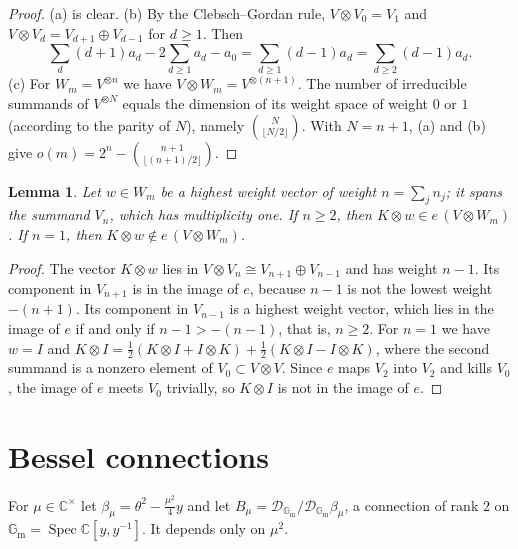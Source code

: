 \documentclass[11pt,a4paper]{article}
\newtheorem{lemma}[theorem]{Lemma}
\theoremstyle{definition}
\theoremstyle{remark}
\numberwithin{equation}{section}
\newcommand{\C}{\mathbb{C}}
\newcommand{\Gm}{\mathbb{G}_{\mathrm{m}}}
\newcommand{\cD}{\mathcal{D}}
\begin{document}
\begin{proof}
(a) is clear. (b) By the Clebsch--Gordan rule, $V\otimes V_0=V_1$ and $V\otimes V_d=V_{d+1}\oplus V_{d-1}$ for $d\ge1$. Then
\[
\sum_d(d+1)a_d-2\sum_{d\ge1}a_d-a_0=\sum_{d\ge1}(d-1)a_d=\sum_{d\ge2}(d-1)a_d .
\]
(c) For $W_m=V^{\otimes n}$ we have $V\otimes W_m=V^{\otimes(n+1)}$. The number of irreducible summands of $V^{\otimes N}$ equals the dimension of its weight space of weight $0$ or $1$ (according to the parity of $N$), namely $\binom{N}{\lfloor N/2\rfloor}$. With $N=n+1$, (a) and (b) give $o(m)=2^n-\binom{n+1}{\lfloor(n+1)/2\rfloor}$.
\end{proof}

\begin{lemma}\label{bo:lem:weight}
Let $w\in W_m$ be a highest weight vector of weight $n=\sum_jn_j$; it spans the summand $V_n$, which has multiplicity one. If $n\ge2$, then $K\otimes w\in e\,(V\otimes W_m)$. If $n=1$, then $K\otimes w\notin e\,(V\otimes W_m)$.
\end{lemma}

\begin{proof}
The vector $K\otimes w$ lies in $V\otimes V_n\cong V_{n+1}\oplus V_{n-1}$ and has weight $n-1$. Its component in $V_{n+1}$ is in the image of $e$, because $n-1$ is not the lowest weight $-(n+1)$. Its component in $V_{n-1}$ is a highest weight vector, which lies in the image of $e$ if and only if $n-1>-(n-1)$, that is, $n\ge2$. For $n=1$ we have $w=I$ and $K\otimes I=\tfrac12(K\otimes I+I\otimes K)+\tfrac12(K\otimes I-I\otimes K)$, where the second summand is a nonzero element of $V_0\subset V\otimes V$. Since $e$ maps $V_2$ into $V_2$ and kills $V_0$, the image of $e$ meets $V_0$ trivially, so $K\otimes I$ is not in the image of $e$.
\end{proof}

\section{Bessel connections}\label{bo:sec:bessel}

For $\mu\in\C^\times$ let $\beta_\mu=\theta^2-\tfrac{\mu^2}{4}y$ and let $B_\mu=\cD_{\Gm}/\cD_{\Gm}\beta_\mu$, a connection of rank $2$ on $\Gm=\operatorname{Spec}\C[y,y^{-1}]$. It depends only on $\mu^2$.
\end{document}
